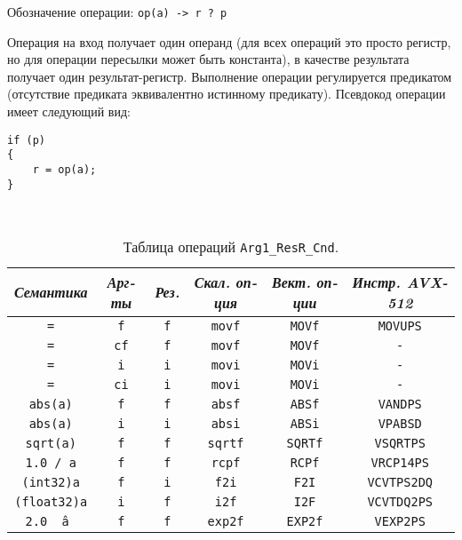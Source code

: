 \documentclass[a4paper,12pt]{extarticle}                     %
\numberwithin{equation}{section}                             %
\numberwithin{figure}{section}                               %
\numberwithin{table}{section}                                %
\theoremstyle{plain}                                         %
\numberwithin{theorem}{section}                              %
\numberwithin{lemma}{section}                                %
\numberwithin{definition}{section}                           %
\begin{document}
Обозначение операции: \texttt{op(a) -> r ? p}

Операция на вход получает один операнд (для всех операций это просто регистр, но для операции пересылки может быть константа), в качестве результата получает один результат-регистр. Выполнение операции регулируется предикатом (отсутствие предиката эквивалентно истинному предикату). Псевдокод операции имеет следующий вид:

\begin{lstlisting}[caption={Псевдокод операции Arg1\_ResR\_Cnd.}]
if (p)
{
    r = op(a);
}

\end{lstlisting}

\

\begin{table}[!h]
\setcaptionmargin{0mm}
\onelinecaptionsfalse
{}
\caption{Таблица операций \texttt{Arg1\_ResR\_Cnd}.}
\bigskip
\begin{tabular}{|c|c|c|c|c|c|}
\hline
\textit{Семантика} & \textit{Арг-ты} & \textit{Рез.} & \textit{Скал. оп-ция} & \textit{Вект. оп-ции} & \textit{Инстр. AVX-512} \\
\hline
\texttt{=}           & \texttt{f}  & \texttt{f} & \texttt{movf}  & \texttt{MOVf}  & \texttt{MOVUPS} \\
\texttt{=}           & \texttt{cf} & \texttt{f} & \texttt{movf}  & \texttt{MOVf}  & \texttt{-} \\
\texttt{=}           & \texttt{i}  & \texttt{i} & \texttt{movi}  & \texttt{MOVi}  & \texttt{-} \\
\texttt{=}           & \texttt{ci} & \texttt{i} & \texttt{movi}  & \texttt{MOVi}  & \texttt{-} \\
\texttt{abs(a)}      & \texttt{f}  & \texttt{f} & \texttt{absf}  & \texttt{ABSf}  & \texttt{VANDPS} \\
\texttt{abs(a)}      & \texttt{i}  & \texttt{i} & \texttt{absi}  & \texttt{ABSi}  & \texttt{VPABSD} \\
\texttt{sqrt(a)}     & \texttt{f}  & \texttt{f} & \texttt{sqrtf} & \texttt{SQRTf} & \texttt{VSQRTPS} \\
\texttt{1.0 / a}     & \texttt{f}  & \texttt{f} & \texttt{rcpf}  & \texttt{RCPf}  & \texttt{VRCP14PS} \\
\texttt{(int32)a}    & \texttt{f}  & \texttt{i} & \texttt{f2i}   & \texttt{F2I}   & \texttt{VCVTPS2DQ} \\
\texttt{(float32)a}  & \texttt{i}  & \texttt{f} & \texttt{i2f}   & \texttt{I2F}   & \texttt{VCVTDQ2PS} \\
\texttt{2.0 \^ \ a } & \texttt{f}  & \texttt{f} & \texttt{exp2f} & \texttt{EXP2f} & \texttt{VEXP2PS} \\
\hline
\end{tabular}
\end{table}
\end{document}
